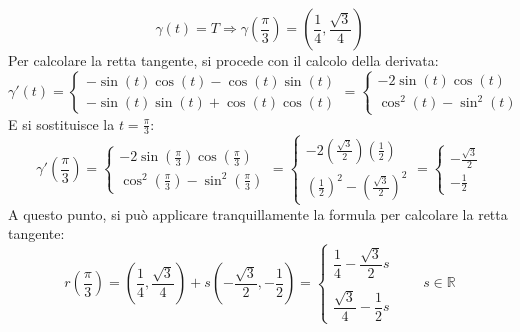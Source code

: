 \documentclass[a4paper]{article}
\begin{document}
	\begin{equation*}
		\gamma\left(t\right) = T \Rightarrow \gamma\left(\dfrac{\pi}{3}\right) = \left(\dfrac{1}{4}, \dfrac{\sqrt{3}}{4}\right)
	\end{equation*}
	Per calcolare la retta tangente, si procede con il calcolo della derivata:
	\begin{equation*}
		\gamma'\left(t\right)
		= 
		\begin{cases}
			-\sin\left(t\right)\cos\left(t\right) - \cos\left(t\right)\sin\left(t\right) \\
			-\sin\left(t\right)\sin\left(t\right) + \cos\left(t\right)\cos\left(t\right)
		\end{cases}
		=
		\begin{cases}
			-2\sin\left(t\right)\cos\left(t\right) \\
			\cos^{2}\left(t\right) - \sin^{2}\left(t\right)
		\end{cases}
	\end{equation*}
	E si sostituisce la $t = \frac{\pi}{3}$:
	\begin{equation*}
		\gamma'\left(\frac{\pi}{3}\right) 
		=
		\begin{cases}
			-2\sin\left(\frac{\pi}{3}\right)\cos\left(\frac{\pi}{3}\right) \\
			\cos^{2}\left(\frac{\pi}{3}\right) - \sin^{2}\left(\frac{\pi}{3}\right)
		\end{cases}
		=
		\begin{cases}
			-2\left(\frac{\sqrt{3}}{2}\right)\left(\frac{1}{2}\right) \\
			\left(\frac{1}{2}\right)^{2} - \left(\frac{\sqrt{3}}{2}\right)^{2}
		\end{cases}
		=
		\begin{cases}
			-\frac{\sqrt{3}}{2} \\
			-\frac{1}{2}
		\end{cases}
	\end{equation*}
	A questo punto, si può applicare tranquillamente la formula per calcolare la retta tangente:
	\begin{equation*}
		r\left(\frac{\pi}{3}\right)
		=
		\left(\dfrac{1}{4}, \dfrac{\sqrt{3}}{4}\right) + s \left(-\frac{\sqrt{3}}{2}, -\frac{1}{2}\right)
		=
		\begin{cases}
			\dfrac{1}{4} - \dfrac{\sqrt{3}}{2}s \\ \\
			\dfrac{\sqrt{3}}{4} - \dfrac{1}{2}s
		\end{cases}
		\hspace{2em}
		s \in \mathbb{R}
	\end{equation*}
\end{document}
